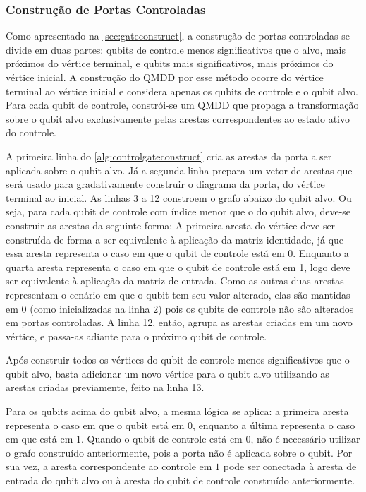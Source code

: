\subsubsection{Construção de Portas Controladas}\label{subsub:controlgate}

Como apresentado na \cref{sec:gateconstruct}, a construção de portas controladas se divide em duas partes: qubits de controle menos significativos que o alvo, mais próximos do vértice terminal, e qubits mais significativos, mais próximos do vértice inicial. A construção do QMDD por esse método ocorre do vértice terminal ao vértice inicial e considera apenas os qubits de controle e o qubit alvo. Para cada qubit de controle, constrói-se um QMDD que propaga a transformação sobre o qubit alvo exclusivamente pelas arestas correspondentes ao estado ativo do controle.

A primeira linha do \cref{alg:controlgateconstruct} cria as arestas da porta a ser aplicada sobre o qubit alvo. Já a segunda linha prepara um vetor de arestas que será usado para gradativamente construir o diagrama da porta, do vértice terminal ao inicial. As linhas 3 a 12 constroem o grafo abaixo do qubit alvo. Ou seja, para cada qubit de controle com índice menor que o do qubit alvo, deve-se construir as arestas da seguinte forma: A primeira aresta do vértice deve ser construída de forma a ser equivalente à aplicação da matriz identidade, já que essa aresta representa o caso em que o qubit de controle está em 0. Enquanto a quarta aresta representa o caso em que o qubit de controle está em 1, logo deve ser equivalente à aplicação da matriz de entrada. Como as outras duas arestas representam o cenário em que o qubit tem seu valor alterado, elas são mantidas em 0 (como inicializadas na linha 2) pois os qubits de controle não são alterados em portas controladas. A linha 12, então, agrupa as arestas criadas em um novo vértice, e passa-as adiante para o próximo qubit de controle.

Após construir todos os vértices do qubit de controle menos significativos que o qubit alvo, basta adicionar um novo vértice para o qubit alvo utilizando as arestas criadas previamente, feito na linha 13.

Para os qubits acima do qubit alvo, a mesma lógica se aplica: a primeira aresta representa o caso em que o qubit está em $0$, enquanto a última representa o caso em que está em $1$. Quando o qubit de controle está em $0$, não é necessário utilizar o grafo construído anteriormente, pois a porta não é aplicada sobre o qubit. Por sua vez, a aresta correspondente ao controle em $1$ pode ser conectada à aresta de entrada do qubit alvo ou à aresta do qubit de controle construído anteriormente.

